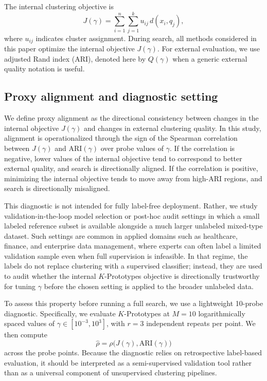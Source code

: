 \documentclass[10pt,lineno]{wlpeerj}
\begin{document}
The internal clustering objective is
\[
J(\gamma) = \sum_{i=1}^{n} \sum_{j=1}^{k} u_{ij} \, d(x_i,q_j),
\]
where $u_{ij}$ indicates cluster assignment. During search, all methods considered in this paper optimize the internal objective $J(\gamma)$. For external evaluation, we use adjusted Rand index (ARI), denoted here by $Q(\gamma)$ when a generic external quality notation is useful.

\subsection*{Proxy alignment and diagnostic setting}

We define proxy alignment as the directional consistency between changes in the internal objective $J(\gamma)$ and changes in external clustering quality. In this study, alignment is operationalized through the sign of the Spearman correlation between $J(\gamma)$ and ARI$(\gamma)$ over probe values of $\gamma$. If the correlation is negative, lower values of the internal objective tend to correspond to better external quality, and search is directionally aligned. If the correlation is positive, minimizing the internal objective tends to move away from high-ARI regions, and search is directionally misaligned.

This diagnostic is not intended for fully label-free deployment. Rather, we study validation-in-the-loop model selection or post-hoc audit settings in which a small labeled reference subset is available alongside a much larger unlabeled mixed-type dataset. Such settings are common in applied domains such as healthcare, finance, and enterprise data management, where experts can often label a limited validation sample even when full supervision is infeasible. In that regime, the labels do not replace clustering with a supervised classifier; instead, they are used to audit whether the internal $K$-Prototypes objective is directionally trustworthy for tuning $\gamma$ before the chosen setting is applied to the broader unlabeled data.

To assess this property before running a full search, we use a lightweight 10-probe diagnostic. Specifically, we evaluate $K$-Prototypes at $M=10$ logarithmically spaced values of $\gamma \in [10^{-3},10^3]$, with $r=3$ independent repeats per point. We then compute
\[
\hat{\rho} = \rho\bigl(J(\gamma), \mathrm{ARI}(\gamma)\bigr)
\]
across the probe points. Because the diagnostic relies on retrospective label-based evaluation, it should be interpreted as a semi-supervised validation tool rather than as a universal component of unsupervised clustering pipelines.
\end{document}
